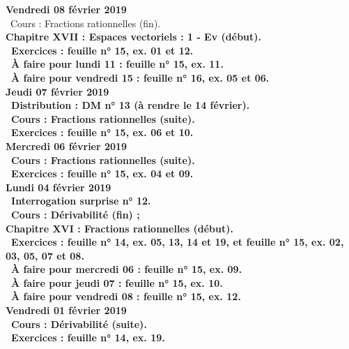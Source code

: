 \documentclass[12pt,a4paper]{article}
\begin{document}
\noindent\textbf{Vendredi 08 février 2019}\\
\bu\ Cours : Fractions rationnelles (fin).\\
\bf Chapitre XVII \rm : Espaces vectoriels : 1 - Ev (début).\\
\bu\ Exercices : feuille n° 15, ex. 01 et 12.\\
\bu\ À faire pour lundi 11 : feuille n° 15, ex. 11.\\
\bu\ À faire pour vendredi 15 : feuille n° 16, ex. 05 et 06.\vspace{.4cm}\\
 
\noindent\textbf{Jeudi 07 février 2019}\\
\bu\ Distribution : DM n° 13 (à rendre le 14 février).\\
\bu\ Cours : Fractions rationnelles (suite).\\
\bu\ Exercices : feuille n° 15, ex. 06 et 10.\vspace{.4cm}\\
 
\noindent\textbf{Mercredi 06 février 2019} \\
\bu\ Cours : Fractions rationnelles (suite).\\
\bu\ Exercices : feuille n° 15, ex. 04 et 09.\vspace{.4cm}\\
 
\noindent\textbf{\bf Lundi 04 février 2019} \\
\bu\ Interrogation surprise n° 12.\\
\bu\ Cours :  Dérivabilité (fin) ;\\
\bf Chapitre XVI \rm : Fractions rationnelles (début).\\
\bu\ Exercices : feuille n° 14, ex. 05, 13, 14 et 19, et feuille n° 15, ex. 02, 03, 05, 07 et 08.\\
\bu\ À faire pour mercredi 06 : feuille n° 15, ex. 09.\\
\bu\ À faire pour jeudi 07 : feuille n° 15, ex. 10.\\
\bu\ À faire pour vendredi 08 : feuille n° 15, ex. 12.\vspace{.4cm}\\
 
\noindent\textbf{Vendredi 01 février 2019}\\
\bu\ Cours : Dérivabilité (suite).\\
\bu\ Exercices : feuille n° 14, ex. 19.\vspace{.4cm}\\
 
\end{document}
